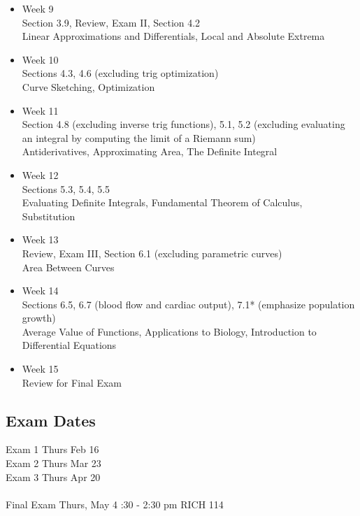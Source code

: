 \documentclass[12pt]{article}
\begin{document}
\begin{itemize}
\item Week 9 \\
Section 3.9, Review, Exam II, Section 4.2 \\
Linear Approximations and Differentials, Local and Absolute Extrema 

\item Week 10 \\
Sections 4.3, 4.6 (excluding trig optimization) \\ 
Curve Sketching, Optimization 

\item Week 11 \\ 
Section 4.8 (excluding inverse trig functions), 5.1, 5.2 (excluding evaluating an integral by computing the limit of a Riemann sum) \\
Antiderivatives, Approximating Area, The Definite Integral 

\item Week 12 \\
Sections 5.3, 5.4, 5.5 \\
Evaluating Definite Integrals, Fundamental Theorem of Calculus, Substitution 

\item Week 13 \\
Review, Exam III, Section 6.1 (excluding parametric curves) \\
Area Between Curves 

\item Week 14  \\
Sections 6.5, 6.7 (blood flow and cardiac output), 7.1* (emphasize population growth) \\
Average Value of Functions, Applications to Biology, Introduction to Differential Equations 
  
\item Week 15 \\
Review for Final Exam \\
\end{itemize}

\subsection*{Exam Dates}
Exam 1   \qquad Thurs Feb 16 \\
Exam 2   \qquad  Thurs Mar 23 \\
Exam 3    \qquad Thurs Apr 20 \\
\\           
Final Exam   \qquad Thurs, May 4 :30 - 2:30 pm \qquad   RICH 114
\end{document}
